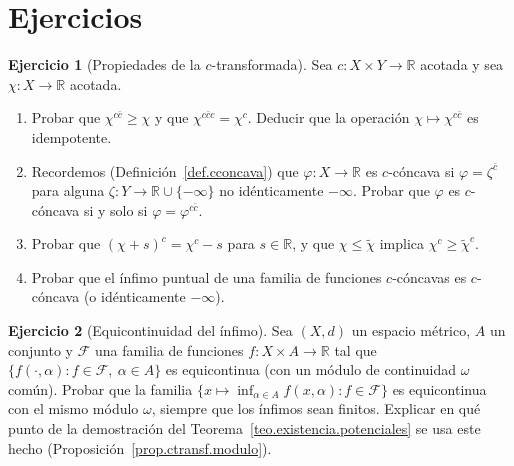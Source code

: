 \documentclass[12pt, a4paper]{amsbook}
\newcommand{\R}{{\mathbb R}}
\theoremstyle{remark}
\theoremstyle{definition}
\newtheorem{ejercicio}{Ejercicio}[chapter]
\numberwithin{section}{chapter}
\numberwithin{subsection}{section}
\numberwithin{equation}{section}
\numberwithin{figure}{chapter}
\begin{document}
\section*{Ejercicios}

\begin{ejercicio}[Propiedades de la $c$-transformada]\label{ejer.ctransf.propiedades}
Sea $c\colon X\times Y\to\R$ acotada y sea $\chi\colon X\to\R$ acotada.
\begin{enumerate}[label=(\alph*)]
\item Probar que $\chi^{c\bar c}\ge\chi$ y que $\chi^{c\bar cc}=\chi^c$.
Deducir que la operación $\chi\mapsto\chi^{c\bar c}$ es idempotente.
\item Recordemos (Definición~\ref{def.cconcava}) que $\varphi\colon X\to\R$
es $c$-cóncava si $\varphi=\zeta^{\bar c}$ para alguna
$\zeta\colon Y\to\R\cup\{-\infty\}$ no idénticamente $-\infty$. Probar que $\varphi$ es $c$-cóncava si y solo si $\varphi=\varphi^{c\bar c}$.
\item Probar que $(\chi+s)^c=\chi^c-s$ para $s\in\R$, y que
$\chi\le\tilde\chi$ implica $\chi^c\ge\tilde\chi^c$.
\item Probar que el ínfimo puntual de una familia de funciones
$c$-cóncavas es $c$-cóncava (o idénticamente $-\infty$).
\end{enumerate}
\end{ejercicio}

\begin{ejercicio}[Equicontinuidad del ínfimo]\label{ejer.equicontinuidad.inf}
Sea $(X,d)$ un espacio métrico, $A$ un conjunto y $\mathcal F$ una familia de
funciones $f\colon X\times A\to\R$ tal que
$\{f(\cdot,\alpha):f\in\mathcal F,\ \alpha\in A\}$ es equicontinua (con un
módulo de continuidad $\omega$ común). Probar que la familia
$\{x\mapsto\inf_{\alpha\in A}f(x,\alpha):f\in\mathcal F\}$ es equicontinua
con el mismo módulo $\omega$, siempre que los ínfimos sean finitos. Explicar
en qué punto de la demostración del Teorema~\ref{teo.existencia.potenciales}
se usa este hecho (Proposición~\ref{prop.ctransf.modulo}).
\end{ejercicio}
\end{document}
